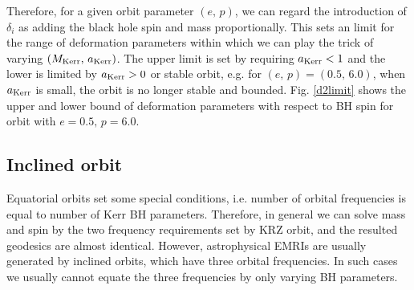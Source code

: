 \documentclass{article}
\begin{document}
Therefore, for a given orbit parameter $(e,\, p)$, we can regard the introduction of $\delta_i$ as adding the black hole spin and mass proportionally. This sets an limit for the range of deformation parameters within which we can play the trick of varying $(M_{\rm{Kerr}},\, a_{\rm{Kerr}})$. The upper limit is set by requiring $a_{\rm{Kerr}}<1$ and the lower is limited by $a_{\rm{Kerr}}>0$ or stable orbit, e.g. for $(e,\, p)=(0.5,\, 6.0)$, when $a_{\rm{Kerr}}$ is small, the orbit is no longer stable and bounded. Fig. \ref{d2limit} shows the upper and lower bound of deformation parameters with respect to BH spin for orbit with $e=0.5,\, p=6.0$. 

\subsection{Inclined orbit}
\label{p_3d}
Equatorial orbits set some special conditions, i.e. number of orbital frequencies is equal to number of Kerr BH parameters. Therefore, in general we can solve mass and spin by the two frequency requirements set by KRZ orbit, and the resulted geodesics are almost identical. However, astrophysical EMRIs are usually generated by inclined orbits, which have three orbital frequencies. In such cases we usually cannot equate the three frequencies by only varying BH parameters. 
\end{document}

